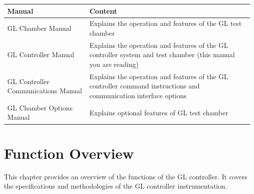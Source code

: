 \begin{longtable}[]{@{}|l|l|@{}}
\toprule
\rowcolor{brown}\begin{minipage}[b]{0.28\columnwidth}\raggedright
{\bf{Manual}}\strut
\end{minipage} & \begin{minipage}[b]{0.66\columnwidth}\raggedright
{\bf{Content}}\strut
\end{minipage}\tabularnewline
\midrule
\endhead
\begin{minipage}[t]{0.28\columnwidth}\raggedright
GL Chamber Manual\strut
\end{minipage} & \begin{minipage}[t]{0.66\columnwidth}\raggedright
Explains the operation and features of the GL test chamber\strut
\end{minipage}\tabularnewline
\begin{minipage}[t]{0.28\columnwidth}\raggedright
GL Controller Manual\strut
\end{minipage} & \begin{minipage}[t]{0.66\columnwidth}\raggedright
Explains the operation and features of the GL controller system and test
chamber (this manual you are reading)\strut
\end{minipage}\tabularnewline
\begin{minipage}[t]{0.28\columnwidth}\raggedright
GL Controller Communications Manual\strut
\end{minipage} & \begin{minipage}[t]{0.66\columnwidth}\raggedright
Explains the operation and features of the GL controller command
instructions and communication interface options\strut
\end{minipage}\tabularnewline
\begin{minipage}[t]{0.28\columnwidth}\raggedright
GL Chamber Options Manual\strut
\end{minipage} & \begin{minipage}[t]{0.66\columnwidth}\raggedright
Explains optional features of GL test chamber\strut
\end{minipage}\tabularnewline
\bottomrule
\end{longtable}


\chapter{Function Overview}

This chapter provides an overview of the functions of the GL controller.
It covers the specifications and methodologies of the GL controller
instrumentation.


